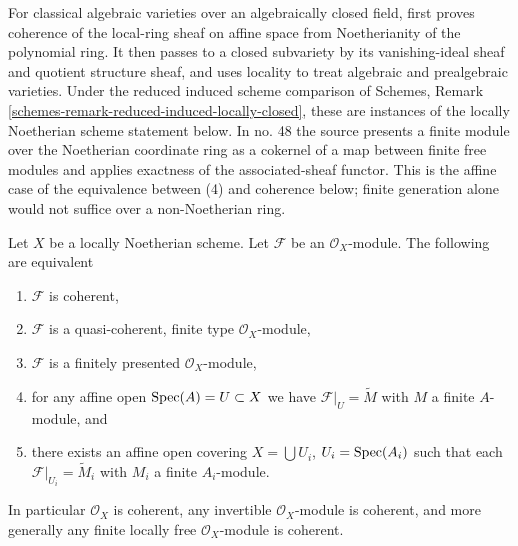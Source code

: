 \begin{lemma}
\label{lemma-coherent-Noetherian}
\begin{reference}
\cite[Chapter I, \S 2, no. 15, Example 2, p. 210]{FAC}
\cite[Chapter II, \S 2, no. 37, Lemma 1, Proposition 1, and Remark,
pp. 230--231]{FAC}
\cite[Chapter II, \S 4, no. 48, Proposition 3, p. 241]{FAC}
\end{reference}
\begin{history}
For classical algebraic varieties over an algebraically closed field,
\cite{FAC} first proves coherence of the local-ring sheaf on affine space
from Noetherianity of the polynomial ring. It then passes to a closed
subvariety by its vanishing-ideal sheaf and quotient structure sheaf, and
uses locality to treat algebraic and prealgebraic varieties. Under the
reduced induced scheme comparison of
Schemes, Remark \ref{schemes-remark-reduced-induced-locally-closed},
these are instances of the locally Noetherian scheme statement below.
In no. 48 the source presents a finite module over the Noetherian coordinate
ring as a cokernel of a map between finite free modules and applies exactness
of the associated-sheaf functor. This is the affine case of the equivalence
between (4) and coherence below; finite generation alone would not suffice
over a non-Noetherian ring.
\end{history}
Let $X$ be a locally Noetherian scheme.
Let $\mathcal{F}$ be an $\mathcal{O}_X$-module.
The following are equivalent
\begin{enumerate}
\item $\mathcal{F}$ is coherent,
\item $\mathcal{F}$ is a quasi-coherent, finite type $\mathcal{O}_X$-module,
\item $\mathcal{F}$ is a finitely presented $\mathcal{O}_X$-module,
\item for any affine open $\mathop{\mathrm{Spec}}(A) = U \subset X$ we have
$\mathcal{F}|_U = \widetilde M$ with $M$ a finite $A$-module, and
\item there exists an affine open covering $X = \bigcup U_i$,
$U_i = \mathop{\mathrm{Spec}}(A_i)$ such that each
$\mathcal{F}|_{U_i} = \widetilde M_i$ with $M_i$ a finite $A_i$-module.
\end{enumerate}
In particular $\mathcal{O}_X$ is coherent, any invertible
$\mathcal{O}_X$-module is coherent, and more generally any
finite locally free $\mathcal{O}_X$-module is coherent.
\end{lemma}


